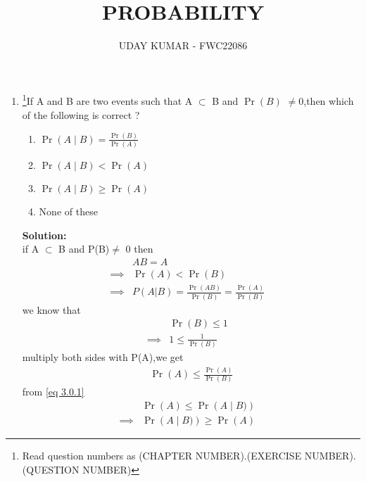 \documentclass{article}
\providecommand{\pr}[1]{\ensuremath{\Pr\left(#1\right)}}
\newcommand{\solution}{\noindent \textbf{Solution: }}
\begin{document}
\title{PROBABILITY}
\author{\Large UDAY KUMAR - FWC22086}
\date{}

\maketitle

\begin{enumerate}[label=13.\arabic{enumi}.\arabic{enumii}]%
\setcounter{enumi}{3}
\setcounter{enumii}{14}

\item \footnote{Read question numbers as (CHAPTER NUMBER).(EXERCISE NUMBER).(QUESTION NUMBER)}{If A and B are two events such that A $\subset$ B and \pr{B} $\neq$0,then which of the following is correct ?}
\begin{enumerate}
\item $\pr{A \mid B} = \frac{\pr{B}}{\pr{A}}$ 
\item $\pr{A \mid B} < \pr{A}$
\item $\pr{A \mid B} \geq \pr{A}$  
\item None of these
\end{enumerate}
	\solution\\
		if A $\subset$ B and P(B)$\neq$ 0 then \\
\begin{align}
& AB =A&\\
\implies&\pr{A} < \pr{B}&\\
\implies&P(A|B) = \frac{\pr{A B}}{\pr{B}}=\frac{\pr{A}}{\pr{B}}&\label{eq 3.0.1}
\end{align}
we know that 
\begin{align}
&\pr{B} \leq 1&\\
\implies&1 \leq \frac{1}{\pr{B}}&
\end{align}
multiply both sides with P(A),we get 
\begin{align}
&\pr{A} \leq \frac{\pr{A}}{\pr{B}}&
\end{align}
from  \eqref{eq 3.0.1}
\begin{align}
&\pr{A} \leq \pr{A \mid B)}&\\
\implies &\pr{A \mid B)} \geq \pr{A}&
\end{align}
\end{enumerate}
\end{document}
